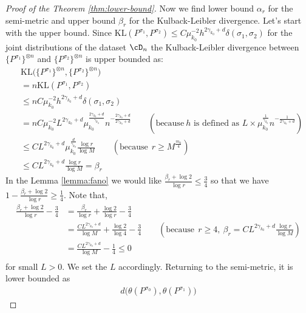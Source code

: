 \begin{proof}[Proof of the Theorem \ref{thm:lower-bound}]
Now we find lower bound $\alpha_r$ for the semi-metric and upper bound $\beta_r$ for the Kulback-Leibler divergence. 
Let's start with the upper bound. Since $\text{KL}(P^{\sigma_1}, P^{\sigma_2}) \le C \mu_{k_0}^{-2} h ^{2\gamma_{k_0} + d }\delta(\sigma_1 , \sigma_2)$ for the joint distributions of the dataset $\cD_n$ the  Kulback-Leibler divergence between $\{P^{\sigma_1}\}^{\otimes n}$ and $\{P^{\sigma_2}\}^{\otimes n}$ is upper bounded as:
\[
\begin{aligned}
    & \textstyle  \text{KL}\big(\{P^{\sigma_1}\}^{\otimes n}, \{P^{\sigma_2}\}^{\otimes n}\big) \\
     & = \textstyle n \text{KL}({P^{\sigma_1}}, {P^{\sigma_2}}) \\
     & \le n C \mu_{k_0}^{-2} h ^{2\gamma_{k_0} + d }\delta(\sigma_1 , \sigma_2)\\
     & =\textstyle  n C \mu_{k_0}^{-2} L^{2\gamma_{k_0} + d } \mu_{k_0}^{\frac{2\gamma_{k_0} + d}{\gamma_{k_0}}}  n ^{-\frac{2\gamma_{k_0} + d}{2\gamma_{k_0} + d}} \quad \quad \textstyle  (\text{because} ~ h \text{ is defined as } L \times   \mu_{k_0}^{\frac{1}{\gamma_{k_0}}} n^{-\frac{1}{2\gamma_{k_0} + d}} )\\
     & \le\textstyle   C  L^{2\gamma_{k_0} + d } \mu_{k_0}^{\frac{ d}{\gamma_{k_0}}}  \frac{\log r}{\log M} \quad \quad (\text{because} ~~ r \ge M^{\frac{m_0}{4}})\\
     & \le \textstyle C  L^{2\gamma_{k_0} + d }  \frac{\log r}{\log M} = \beta_r
\end{aligned}
\]
In the Lemma \ref{lemma:fano} we would like $\frac{\beta_r + \log 2}{\log r} \le \frac{3}{4}$ so that we have $1 - \frac{\beta_r + \log 2}{\log r} \ge \frac14$. 
Note that, 
\[
\begin{aligned}
   \textstyle  \frac{\beta_r + \log 2}{\log r} - \frac{3}{4} & \textstyle = \frac{\beta_r}{\log r}  + \frac{\log 2}{\log r} - \frac{3}{4} \\
   & \textstyle = \frac{C L^{2\gamma_{k_0} + d }}{\log M}  + \frac{\log 2}{\log 4} - \frac{3}{4} \quad \quad (\text{because} ~~ r \ge 4,~ \beta_r = C  L^{2\gamma_{k_0} + d }  \frac{\log r}{\log M} )\\
   & = \textstyle \frac{C L^{2\gamma_{k_0} + d }}{\log M} - \frac14 \le 0\\
\end{aligned}
\] for small $L > 0$. We set the $L$ accordingly. Returning to the semi-metric, it is lower bounded as 
\[
\begin{aligned}
     d\big (\theta(P^{\sigma_0}), \theta(P^{\sigma_1})\big)

\end{aligned}\]
\end{proof}
